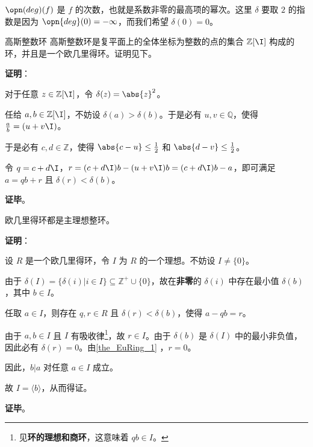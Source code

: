 $\opn(deg)(f)$ 是 $f$ 的次数，也就是系数非零的最高项的幂次。这里 $\delta$ 要取 $2$ 的指数是因为 $\opn{deg}(0)=-\infty$，而我们希望 $\delta(0)=0$。

\begin{example}{高斯整数环}
高斯整数环是复平面上的全体坐标为整数的点的集合 $\mathbb{Z}[\I]$ 构成的环，并且是一个欧几里得环。证明见下。
\end{example}

\textbf{证明}：

对于任意 $z\in\mathbb{Z}[\I]$，令 $\delta(z)=\abs{z}^2$。

任给 $a, b\in\mathbb{Z}[\I]$，不妨设 $\delta(a)>\delta(b)$。于是必有 $u, v\in\mathbb{Q}$，使得 $\frac{a}{b}=(u+v\I)$。

于是必有 $c, d\in\mathbb{Z}$，使得 $\abs{c-u}\leq\frac{1}{2}$ 和 $\abs{d-v}\leq\frac{1}{2}$。

令 $q=c+d\I$，$r=(c+d\I)b-(u+v\I)b=(c+d\I)b-a$，即可满足 $a=qb+r$ 且 $\delta(r)<\delta(b)$。

\textbf{证毕}。

\begin{theorem}{}
欧几里得环都是主理想整环。
\end{theorem}

\textbf{证明}：

设 $R$ 是一个欧几里得环，令 $I$ 为 $R$ 的一个理想。不妨设 $I\not=\{0\}$。

由于 $\delta(I)=\{\delta(i)|i\in I\}\subseteq\mathbb{Z}^+\cup\{0\}$，故在\textbf{非零}的 $\delta(i)$ 中存在最小值 $\delta(b)$，其中 $b\in I$。

任取 $a\in I$，则存在 $q, r\in R$ 且 $\delta(r)<\delta(b)$，使得 $a-qb=r$。

由于 $a, b\in I$ 且 $I$ 有吸收律\footnote{见\textbf{环的理想和商环}，这意味着 $qb\in I$。}，故 $r\in I$。由于 $\delta(b)$ 是 $\delta(I)$ 中的最小非负值，因此必有 $\delta(r)=0$。由\autoref{the_EuRing_1} ，$r=0$。

因此，$b|a$ 对任意 $a\in I$ 成立。

故 $I=\langle b \rangle$，从而得证。

\textbf{证毕}。



